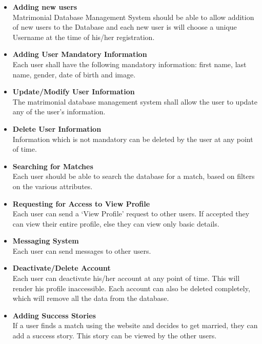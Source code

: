 \documentclass[12pt]{report}
\begin{document}
\begin{itemize}

\item \textbf{Adding new users}\\ Matrimonial Database Management System should be able to allow addition of new users to the Database and each new user is will choose a unique Username at the time of his/her registration.
 
 
\item \textbf{Adding User Mandatory Information}\\
Each user shall have the following mandatory information: first name, last name, gender, date of birth and image. 

\item \textbf{Update/Modify User Information}\\
The matrimonial database management system shall allow the user to update any of the user’s information.

\item \textbf{Delete User Information}\\Information which is not mandatory can be deleted by the user at any point of time. 

\item\textbf{Searching for Matches} \\Each user should be able to search the database for a match, based on filters on the various attributes. 

\item\textbf{Requesting for Access to View Profile}\\
Each user can send a ‘View Profile’ request to other users. If accepted they can view their entire profile, else they can view only basic details. 


\item\textbf{Messaging System} \\Each user can send messages to other users. 

\item\textbf{Deactivate/Delete Account} \\Each user can deactivate his/her account at any point of time. This will render his profile inaccessible. 
Each account can also be deleted completely, which will remove all the data from the database. 

\item\textbf{Adding Success Stories} \\If a user finds a match using the website and decides to get married, they can add a success story. This story can be viewed by the other users. 


\end{itemize} 
\end{document}
